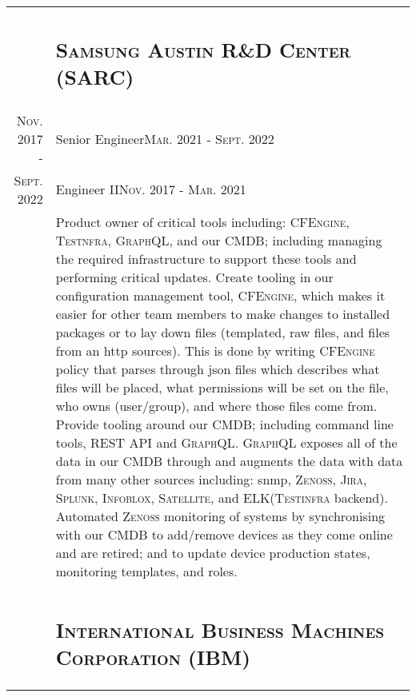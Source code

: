 \documentclass[letterpaper,10pt]{article}
\begin{document}
\begin{tabular}{R|B}
	                                & \subsection{\textsc{Samsung Austin R\&D Center (SARC)}}                                        \\
	\textsc{Nov.} 2017 -            & Senior Engineer\hfill\small{\textsc{Mar.} 2021 - \textsc{Sept.} 2022}                          \\
	\textsc{Sept.} 2022\phantom{ -} & Engineer II\hfill\small{\textsc{Nov.} 2017 - \textsc{Mar.} 2021}                               \\
	                                & \footnotesize Product owner of critical tools including: \textsc{CFEngine, Testnfra, GraphQL},
	and our CMDB; including managing the required infrastructure to support these tools and performing 	critical updates.
	Create tooling in our configuration management tool, \textsc{CFEngine}, which makes it easier for other team members
	to make changes to installed packages or to lay down files (templated, raw files, and files from an http sources).
	This is done by writing \textsc{CFEngine} policy that parses through json files which describes what files will be placed,
	what permissions will be set on the file, who owns (user/group), and where those files come from. Provide tooling around our CMDB;
	including command line tools, REST API and \textsc{GraphQL}. \textsc{GraphQL} exposes all of the data in our CMDB through and
	augments the data with data from many other sources including: snmp, \textsc{Zenoss, Jira, Splunk, Infoblox, Satellite},
	and \textsc{ELK}(\textsc{Testinfra} backend). Automated \textsc{Zenoss} monitoring of systems by synchronising with our
	CMDB to add/remove devices as they come online and are retired; and to update device production states, monitoring templates,
	and roles.                                                                                                                       \\
	                                                                                                             \\

	                                & \subsection{\textsc{International Business Machines Corporation (IBM)}}                        \\


\end{tabular}
\end{document}
